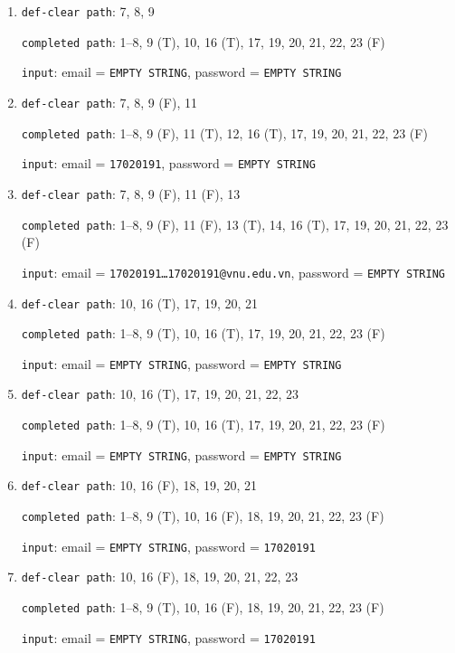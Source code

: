 \documentclass{article}
\begin{document}
\begin{enumerate}
    \item \texttt{def-clear path}: 7, 8, 9
          \par \texttt{completed path}: 1--8, 9 (T), 10, 16 (T), 17, 19, 20, 21, 22, 23 (F)
          \par \texttt{input}: email = \texttt{EMPTY STRING}, password = \texttt{EMPTY STRING}

    \item \texttt{def-clear path}: 7, 8, 9 (F), 11
          \par \texttt{completed path}: 1--8, 9 (F), 11 (T), 12, 16 (T), 17, 19, 20, 21, 22, 23 (F)
          \par \texttt{input}: email = \texttt{17020191}, password = \texttt{EMPTY STRING}

    \item \texttt{def-clear path}: 7, 8, 9 (F), 11 (F), 13
          \par \texttt{completed path}: 1--8, 9 (F), 11 (F), 13 (T), 14, 16 (T), 17, 19, 20, 21, 22, 23 (F)
          \par \texttt{input}: email = \texttt{17020191\ldots17020191@vnu.edu.vn}, password = \texttt{EMPTY STRING}

    \item \texttt{def-clear path}: 10, 16 (T), 17, 19, 20, 21
          \par \texttt{completed path}: 1--8, 9 (T), 10, 16 (T), 17, 19, 20, 21, 22, 23 (F)
          \par \texttt{input}: email = \texttt{EMPTY STRING}, password = \texttt{EMPTY STRING}

    \item \texttt{def-clear path}: 10, 16 (T), 17, 19, 20, 21, 22, 23
          \par \texttt{completed path}: 1--8, 9 (T), 10, 16 (T), 17, 19, 20, 21, 22, 23 (F)
          \par \texttt{input}: email = \texttt{EMPTY STRING}, password = \texttt{EMPTY STRING}

    \item \texttt{def-clear path}: 10, 16 (F), 18, 19, 20, 21
          \par \texttt{completed path}: 1--8, 9 (T), 10, 16 (F), 18, 19, 20, 21, 22, 23 (F)
          \par \texttt{input}: email = \texttt{EMPTY STRING}, password = \texttt{17020191}

    \item \texttt{def-clear path}: 10, 16 (F), 18, 19, 20, 21, 22, 23
          \par \texttt{completed path}: 1--8, 9 (T), 10, 16 (F), 18, 19, 20, 21, 22, 23 (F)
          \par \texttt{input}: email = \texttt{EMPTY STRING}, password = \texttt{17020191}


\end{enumerate}
\end{document}
